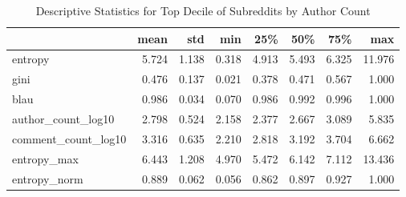 \begin{table}
\centering
\begin{tabular}{lrrrrrrr}
\toprule
{} &  mean &   std &   min &   25\% &   50\% &   75\% &    max \\
\midrule
entropy             & 5.724 & 1.138 & 0.318 & 4.913 & 5.493 & 6.325 & 11.976 \\
gini                & 0.476 & 0.137 & 0.021 & 0.378 & 0.471 & 0.567 &  1.000 \\
blau                & 0.986 & 0.034 & 0.070 & 0.986 & 0.992 & 0.996 &  1.000 \\
author\_count\_log10  & 2.798 & 0.524 & 2.158 & 2.377 & 2.667 & 3.089 &  5.835 \\
comment\_count\_log10 & 3.316 & 0.635 & 2.210 & 2.818 & 3.192 & 3.704 &  6.662 \\
entropy\_max         & 6.443 & 1.208 & 4.970 & 5.472 & 6.142 & 7.112 & 13.436 \\
entropy\_norm        & 0.889 & 0.062 & 0.056 & 0.862 & 0.897 & 0.927 &  1.000 \\
\bottomrule
\end{tabular}
\caption{Descriptive Statistics for Top Decile of Subreddits by Author Count}
\label{table/active}
\end{table}